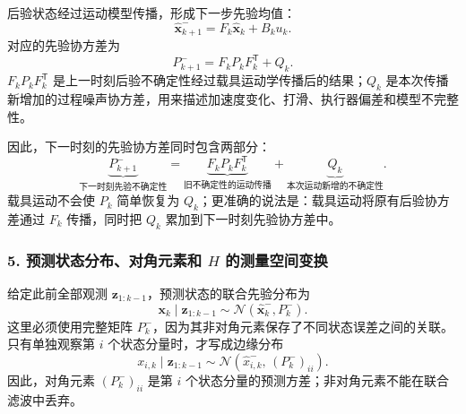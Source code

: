\documentclass[UTF8,a4paper,11pt]{ctexart}
\newcommand{\prior}{^{-}}
\newcommand{\transpose}{^{\mathsf T}}
\begin{document}
后验状态经过运动模型传播，形成下一步先验均值：
\begin{equation}
\hat{\bm x}_{k+1}\prior
=F_k\hat{\bm x}_k+B_ku_k.
\end{equation}
对应的先验协方差为
\begin{equation}
\boxed{
P_{k+1}\prior
=F_kP_kF_k\transpose+Q_k
}.
\end{equation}
$F_kP_kF_k\transpose$ 是上一时刻后验不确定性经过载具运动学传播后的结果；$Q_k$ 是本次传播新增加的过程噪声协方差，用来描述加速度变化、打滑、执行器偏差和模型不完整性。

因此，下一时刻的先验协方差同时包含两部分：
\begin{equation}
\underbrace{P_{k+1}\prior}_{\text{下一时刻先验不确定性}}
=
\underbrace{F_kP_kF_k\transpose}_{\text{旧不确定性的运动传播}}
+
\underbrace{Q_k}_{\text{本次运动新增的不确定性}}.
\end{equation}
载具运动不会使 $P_k$ 简单恢复为 $Q_k$；更准确的说法是：载具运动将原有后验协方差通过 $F_k$ 传播，同时把 $Q_k$ 累加到下一时刻先验协方差中。

\subsubsection*{5. 预测状态分布、对角元素和 \texorpdfstring{$H$}{H} 的测量空间变换}

给定此前全部观测 $\bm z_{1:k-1}$，预测状态的联合先验分布为
\begin{equation}
\boxed{
\bm x_k\mid\bm z_{1:k-1}
\sim
\mathcal N(\hat{\bm x}_k\prior,P_k\prior)
}.
\end{equation}
这里必须使用完整矩阵 $P_k\prior$，因为其非对角元素保存了不同状态误差之间的关联。只有单独观察第 $i$ 个状态分量时，才写成边缘分布
\begin{equation}
x_{i,k}\mid\bm z_{1:k-1}
\sim
\mathcal N\!\left(
\hat x_{i,k}\prior,\,
(P_k\prior)_{ii}
\right).
\end{equation}
因此，对角元素 $(P_k\prior)_{ii}$ 是第 $i$ 个状态分量的预测方差；非对角元素不能在联合滤波中丢弃。
\end{document}
